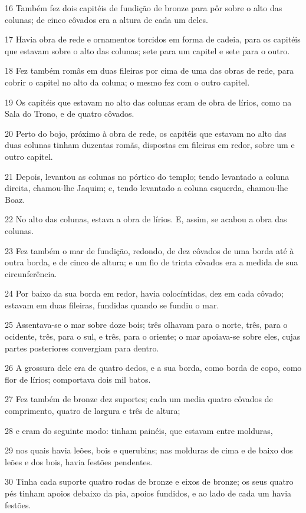 \par 16 Também fez dois capitéis de fundição de bronze para pôr sobre o alto das colunas; de cinco côvados era a altura de cada um deles.
\par 17 Havia obra de rede e ornamentos torcidos em forma de cadeia, para os capitéis que estavam sobre o alto das colunas; sete para um capitel e sete para o outro.
\par 18 Fez também romãs em duas fileiras por cima de uma das obras de rede, para cobrir o capitel no alto da coluna; o mesmo fez com o outro capitel.
\par 19 Os capitéis que estavam no alto das colunas eram de obra de lírios, como na Sala do Trono, e de quatro côvados.
\par 20 Perto do bojo, próximo à obra de rede, os capitéis que estavam no alto das duas colunas tinham duzentas romãs, dispostas em fileiras em redor, sobre um e outro capitel.
\par 21 Depois, levantou as colunas no pórtico do templo; tendo levantado a coluna direita, chamou-lhe Jaquim; e, tendo levantado a coluna esquerda, chamou-lhe Boaz.
\par 22 No alto das colunas, estava a obra de lírios. E, assim, se acabou a obra das colunas.
\par 23 Fez também o mar de fundição, redondo, de dez côvados de uma borda até à outra borda, e de cinco de altura; e um fio de trinta côvados era a medida de sua circunferência.
\par 24 Por baixo da sua borda em redor, havia colocíntidas, dez em cada côvado; estavam em duas fileiras, fundidas quando se fundiu o mar.
\par 25 Assentava-se o mar sobre doze bois; três olhavam para o norte, três, para o ocidente, três, para o sul, e três, para o oriente; o mar apoiava-se sobre eles, cujas partes posteriores convergiam para dentro.
\par 26 A grossura dele era de quatro dedos, e a sua borda, como borda de copo, como flor de lírios; comportava dois mil batos.
\par 27 Fez também de bronze dez suportes; cada um media quatro côvados de comprimento, quatro de largura e três de altura;
\par 28 e eram do seguinte modo: tinham painéis, que estavam entre molduras,
\par 29 nos quais havia leões, bois e querubins; nas molduras de cima e de baixo dos leões e dos bois, havia festões pendentes.
\par 30 Tinha cada suporte quatro rodas de bronze e eixos de bronze; os seus quatro pés tinham apoios debaixo da pia, apoios fundidos, e ao lado de cada um havia festões.
